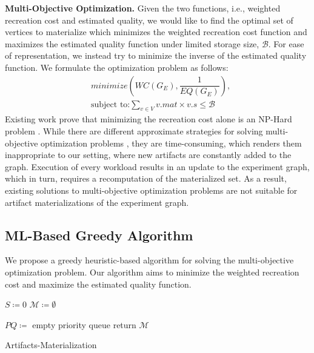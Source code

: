 \textbf{Multi-Objective Optimization.}
Given the two functions, i.e., weighted recreation cost and estimated quality, we would like to find the optimal set of vertices to materialize which minimizes the weighted recreation cost function and maximizes the estimated quality function under limited storage size, $\mathcal{B}$.
For ease of representation, we instead try to minimize the inverse of the estimated quality function.
We formulate the optimization problem as follows:
\begin{equation}\label{multi-obj-opt}
\begin{split}
& minimize(WC(G_E), \dfrac{1}{EQ(G_E)}), \\
& \text{subject to:} \sum\limits_{v \in V} v.mat \times v.s \leq \mathcal{B}
\end{split}
\end{equation}
Existing work prove that minimizing the recreation cost alone is an NP-Hard problem \cite{bhattacherjee2015principles}.
While there are different approximate strategies for solving multi-objective optimization problems \cite{coello2007evolutionary}, they are time-consuming, which renders them inappropriate to our setting, where new artifacts are constantly added to the graph.
Execution of every workload results in an update to the experiment graph, which in turn, requires a recomputation of the materialized set.
As a result, existing solutions to multi-objective optimization problems are not suitable for artifact materializations of the experiment graph.
\subsection{ML-Based Greedy Algorithm}\label{subsec-ml-based-materialization}
We propose a greedy heuristic-based algorithm for solving the multi-objective optimization problem.
Our algorithm aims to minimize the weighted recreation cost and maximize the estimated quality function.
\begin{algorithm}[h]
$S \coloneqq 0$
$\mathcal{M} \coloneqq \emptyset$

$PQ \coloneqq $ empty priority queue\;
return $\mathcal{M}$\;
\caption{Artifacts-Materialization}\label{algorithm-materialization}
\end{algorithm}

